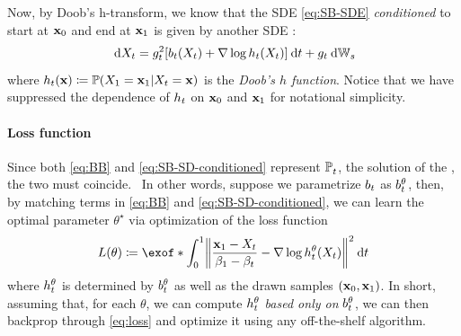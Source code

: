 Now, by Doob's h-transform, we know that the \acrshort{SDE} \eqref{eq:SB-SDE} \emph{conditioned} to start at $\mathbf{x}_0$ and end at $\mathbf{x}_1$ is given by another \acrshort{SDE}  \citep{doob1984classical,rogers2000diffusions}:
\begin{equation}
\label{eq:SB-SD-conditioned}
\dd X_t = \volatsq[\ctime]\bracks*{\fdrift(X_t) + \nabla \log \doob(X_t) }\dt +\volat \dWiener
\end{equation}
where $h_t(\mathbf{x}) \coloneqq \operatorname{\mathbb{P}}(X_1 = \mathbf{x}_1\vert X_t = \mathbf{x})$ is the \emph{Doob's $h$ function}. Notice that we have suppressed the dependence of $h_t$ on $\mathbf{x}_0$ and $\mathbf{x}_1$ for notational simplicity.%



\paragraph{Loss function}

Since both \eqref{eq:BB} and \eqref{eq:SB-SD-conditioned} represent $\mathbb{P}^{}_{ t }$, the solution of the , the two  must coincide. 
~In other words, suppose we parametrize $b_t$ as $b_t^\theta$, then, by matching terms in \eqref{eq:BB} and \eqref{eq:SB-SD-conditioned}, we can learn the optimal parameter $\theta^\star$ via optimization of the loss function
\begin{equation}
\label{eq:loss}
\Loss(\theta) \defeq \exof*{\int_0^1 \norm*{ \frac{\x_1-X_t}{\cvolat[\horizon]-\cvolat[\ctime]}-\nabla \log \doob^\theta(X_t)}^2 \dt  }
\end{equation}where $h_t^\theta$ is determined by $b_t^\theta$ as well as the drawn samples $(\mathbf{x}_0,\mathbf{x}_1)$. In short, assuming that, for each $\theta$, we can compute $h_t^\theta$ \emph{based only on} $b_t^\theta$, we can then backprop through \eqref{eq:loss} and optimize it using any off-the-shelf algorithm.



